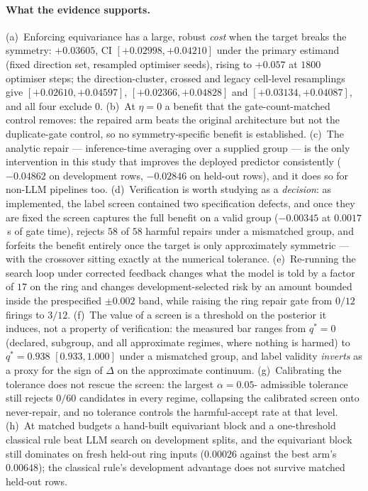 \documentclass[11pt]{article}
\begin{document}
\paragraph{What the evidence supports.}
(a)~Enforcing equivariance has a large, robust \emph{cost} when the target breaks the
symmetry: $+0.03605$, CI $[+0.02998,+0.04210]$ under the primary estimand (fixed direction
set, resampled optimiser seeds), rising to $+0.057$ at $1800$ optimiser steps; the
direction-cluster, crossed and legacy cell-level resamplings give
$[+0.02610,+0.04597]$, $[+0.02366,+0.04828]$ and $[+0.03134,+0.04087]$, and all four exclude
$0$. (b)~At $\eta{=}0$ a benefit that the gate-count-matched control removes: the repaired arm
beats the original architecture but not the duplicate-gate control, so no symmetry-specific
benefit is established. (c)~The analytic repair --- inference-time averaging over a supplied
group --- is the only intervention in this study that improves the deployed predictor
consistently ($-0.04862$ on development rows, $-0.02846$ on held-out rows), and it does so for
non-LLM pipelines too. (d)~Verification is worth studying as a \emph{decision}: as
implemented, the label screen contained two specification defects, and once they are fixed the
screen captures the full benefit on a valid group ($-0.00345$ at $0.0017$\,s of gate time),
rejects $58$ of $58$ harmful repairs under a mismatched group, and forfeits the benefit
entirely once the target is only approximately symmetric --- with the crossover sitting exactly
at the numerical tolerance. (e)~Re-running the search loop under corrected feedback changes what
the model is told by a factor of $17$ on the ring and changes development-selected risk by an
amount bounded inside the prespecified $\pm0.002$ band, while raising the ring repair gate from
$0/12$ firings to $3/12$. (f)~The value of a screen is a threshold on the posterior it induces, not
a property of verification: the measured bar ranges from $q^* = 0$ (declared, subgroup, and all
approximate regimes, where nothing is harmed) to $q^* = 0.938$ $[0.933, 1.000]$ under a mismatched
group, and label validity \emph{inverts} as a proxy for the sign of $\Delta$ on the approximate
continuum. (g)~Calibrating the tolerance does not rescue the screen: the largest $\alpha{=}0.05$-
admissible tolerance still rejects $0/60$ candidates in every regime, collapsing the calibrated
screen onto never-repair, and no tolerance controls the harmful-accept rate at that level. (h)~At
matched budgets a hand-built equivariant block and a
one-threshold classical rule beat LLM search on development splits, and the equivariant block
still dominates on fresh held-out ring inputs ($0.00026$ against the best arm's $0.00648$);
the classical rule's development advantage does not survive matched held-out rows.
\end{document}
